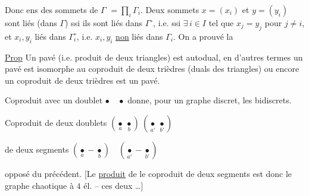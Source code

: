 Donc ens des sommets de $\Gamma$  $=\prod_i\Gamma_i$. Deux sommets $x=(x_i)$ et $y=(y_i)$  sont  liés (dans $\Gamma$) ssi ils sont  liés dans $\Gamma^\circ$, i.e. ssi $\exists\,i\in I$ tel que $x_j=y_j$ pour $j\ne i$, et $x_i,y_i$  liés dans $\Gamma_i^\circ$, i.e. $x_i,y_i$ \uline{non} liés dans $\Gamma_i$. On a prouvé la


\uline{Prop} Un pavé (i.e.  produit de deux triangles) est autodual, en d'autres termes un pavé est isomorphe au coproduit de deux trièdres (duals des triangles) ou encore un coproduit de deux trièdres est un pavé.


Coproduit  avec un doublet $\bullet\quad\bullet$ donne, pour un graphe discret, les  bidiscrets.

Coproduit de deux doublets $(\underset a\bullet\ \underset b\bullet)\ (\underset{a'}\bullet\ \underset{b'}\bullet)$


 de deux segments $(\underset{a}{\bullet}\!-\!\underset{b}{\bullet})\quad(\underset{a'}{\bullet}\!-\!\underset{b'}{\bullet})$


 opposé du précédent. [Le \uline{produit} de    le coproduit de deux segments est donc le graphe chaotique à $4$ él. -- ces deux   \ldots]

